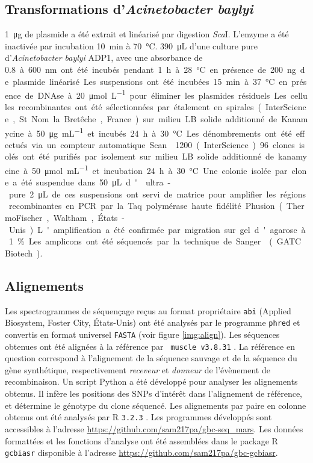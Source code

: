 \subsection{Transformations d'\emph{Acinetobacter baylyi}}
\label{subsec:transfo}


\SI{1}{\ug} de plasmide a été extrait et linéarisé par digestion \emph{Sca}I.
L'enzyme a été inactivée par incubation \SI{10}{\minute} à \SI{70}{\celsius}.
\SI{390}{\uL} d'une culture pure d'\emph{Acinetobacter baylyi} ADP1,
avec une absorbance de \SI{0,8} à \SI{600}{\nm} ont été incubés pendant
\SI{1}{\hour} à \SI{28}{\celsius} en présence de \SI{200}{\ng} de plasmide linéarisé.
Les suspensions ont été incubées \SI{15}{\minute} à \SI{37}{\celsius} en présence de
DNAse à \SI{20}{\umol\per\L} pour éliminer les plasmides résiduels. Les cellules
recombinantes ont été sélectionnées par étalement en spirales (InterScience, St
Nom la Bretêche, France) sur milieu LB solide additionné de Kanamycine à
\SI{50}{\ug\per\mL} et incubés \SI{24}{\hour} à \SI{30}{\celsius}. Les
dénombrements ont été effectués via un compteur automatique
Scan\textsuperscript{\textregistered}1200 (InterScience).

96 clones isolés ont été purifiés par isolement sur milieu LB solide additionné
de kanamycine à \SI{50}{\umol\per\mL} et incubation \SI{24}{\hour} à
\SI{30}{\celsius}. Une colonie isolée par clone a été suspendue dans
\SI{50}{\uL} d' ultra-pure. \SI{2}{\uL} de ces suspensions ont servi de
matrice pour amplifier les régions recombinantes en PCR par la Taq polymérase
haute fidélité Phusion (ThermoFischer, Waltham, États-Unis). L'amplification a
été confirmée par migration sur gel d'agarose à 1\%. Les amplicons ont été
séquencés par la technique de Sanger\cite{sanger_dna_1977} (GATC Biotech).

\subsection{Alignements}
\label{subsec:align}


Les spectrogrammes de séquençage reçus au format propriétaire \texttt{abi}
(Applied Biosystem, Foster City, États-Unis) ont été analysés par le programme
\texttt{phred} \cite{ewing_base-calling_1998} et convertis en format universel
\texttt{FASTA} (voir figure \ref{img:align}). Les séquences obtenues ont été
alignées à la référence par \texttt{ muscle v3.8.31} \cite{edgar_muscle:_2004}.
La référence en question correspond à l'alignement de la séquence sauvage et de
la séquence du gène synthétique, respectivement \emph{receveur} et
\emph{donneur} de l'évènement de recombinaison. Un script Python
\cite{cock_biopython:_2009} a été développé pour analyser les alignements
obtenus. Il infère les positions des SNPs d'intérêt dans l'alignement de
référence, et détermine le génotype du clone séquencé. Les alignements par paire
en colonne obtenus ont été analysés par \textrm{R} \texttt{3.2.3}
\cite{r_core_team_r:_2015}. Les programmes développés sont accessibles à
l'adresse \url{https://github.com/sam217pa/gbc-seq_mars}. Les données formattées
et les fonctions d'analyse ont été assemblées dans le package \textrm{R}
\texttt{gcbiasr} disponible à l'adresse
\url{https://github.com/sam217pa/gbc-gcbiasr}.
